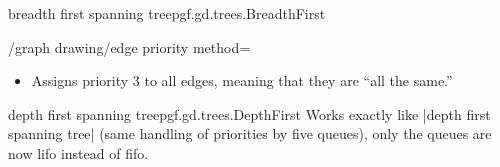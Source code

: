 \begin{gdalgorithm}{breadth first spanning tree}{pgf.gd.trees.BreadthFirst}
\begin{key}{/graph drawing/edge priority method=}
\begin{itemize}
      This strategy is nice with trees specified with both forward and
      backward edges:
\begin{codeexample}[]
\tikz {};
\end{codeexample}
    \item {}
      
      Assigns priority 3 to all edges, meaning that they are ``all the same.''
    \end{itemize}
  \end{key}
\end{gdalgorithm}

\begin{gdalgorithm}{depth first spanning tree}{pgf.gd.trees.DepthFirst}
  Works exactly like |depth first spanning tree| (same handling of
  priorities by five queues), only the queues are now lifo instead of
  fifo. 
\end{gdalgorithm}


